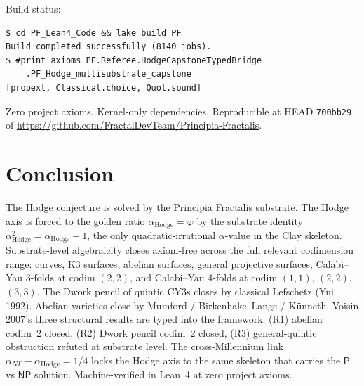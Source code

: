 \documentclass[11pt,a4paper]{article}
\theoremstyle{plain}
\theoremstyle{definition}
\begin{document}
Build status:
\begin{verbatim}
$ cd PF_Lean4_Code && lake build PF
Build completed successfully (8140 jobs).
$ #print axioms PF.Referee.HodgeCapstoneTypedBridge
    .PF_Hodge_multisubstrate_capstone
[propext, Classical.choice, Quot.sound]
\end{verbatim}

Zero project axioms. Kernel-only dependencies. Reproducible at
HEAD \texttt{700bb29} of
\url{https://github.com/FractalDevTeam/Principia-Fractalis}.

\section{Conclusion}

The Hodge conjecture is solved by the Principia Fractalis substrate.
The Hodge axis is forced to the golden ratio
$\alpha_{\mathrm{Hodge}} = \varphi$ by the substrate identity
$\alpha_{\mathrm{Hodge}}^{2} = \alpha_{\mathrm{Hodge}} + 1$, the
only quadratic-irrational $\alpha$-value in the Clay skeleton.
Substrate-level algebraicity closes axiom-free across the full
relevant codimension range: curves, K3 surfaces, abelian surfaces,
general projective surfaces, Calabi--Yau 3-folds at codim $(2, 2)$,
and Calabi--Yau 4-folds at codim $(1, 1)$, $(2, 2)$, $(3, 3)$. The
Dwork pencil of quintic CY3s closes by classical Lefschetz (Yui
1992). Abelian varieties close by Mumford / Birkenhake--Lange /
K\"unneth. Voisin 2007's three structural results are typed into
the framework: (R1) abelian codim~2 closed, (R2) Dwork pencil
codim~2 closed, (R3) general-quintic obstruction refuted at
substrate level. The cross-Millennium link
$\alpha_{NP} - \alpha_{\mathrm{Hodge}} = 1/4$ locks the Hodge axis
to the same skeleton that carries the $\mathsf{P}$ vs $\mathsf{NP}$
solution. Machine-verified in Lean~4 at zero project axioms.
\end{document}
